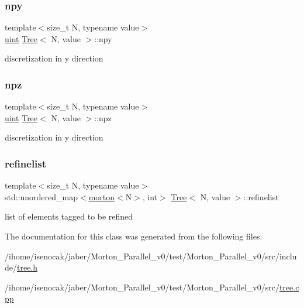 \subsubsection{\texorpdfstring{npy}{npy}}
{\footnotesize\ttfamily template$<$size\+\_\+t N, typename value$>$ \\
\mbox{\hyperlink{definitions_8h_a69aa29b598b851b0640aa225a9e5d61d}{uint}} \mbox{\hyperlink{classTree}{Tree}}$<$ N, value $>$\+::npy\hspace{0.3cm}{\ttfamily [protected]}}

discretization in y direction \mbox{\label{classTree_a0b132f3e84c33e27e1f78f0542081e7b}} 
\subsubsection{\texorpdfstring{npz}{npz}}
{\footnotesize\ttfamily template$<$size\+\_\+t N, typename value$>$ \\
\mbox{\hyperlink{definitions_8h_a69aa29b598b851b0640aa225a9e5d61d}{uint}} \mbox{\hyperlink{classTree}{Tree}}$<$ N, value $>$\+::npz\hspace{0.3cm}{\ttfamily [protected]}}

discretization in y direction \mbox{\label{classTree_a2fbb2b9ed44f73aa10192eab2a9d126b}} 
\subsubsection{\texorpdfstring{refinelist}{refinelist}}
{\footnotesize\ttfamily template$<$size\+\_\+t N, typename value$>$ \\
std\+::unordered\+\_\+map$<$\mbox{\hyperlink{definitions_8h_af8682350bd8bb38ee9023f7a0a310add}{morton}}$<$N$>$, int$>$ \mbox{\hyperlink{classTree}{Tree}}$<$ N, value $>$\+::refinelist\hspace{0.3cm}{\ttfamily [private]}}

list of elements tagged to be refined 

The documentation for this class was generated from the following files\+:\begin{DoxyCompactItemize}
\item 
/ihome/isenocak/jaber/\+Morton\+\_\+\+Parallel\+\_\+v0/test/\+Morton\+\_\+\+Parallel\+\_\+v0/src/include/\mbox{\hyperlink{tree_8h}{tree.\+h}}\item 
/ihome/isenocak/jaber/\+Morton\+\_\+\+Parallel\+\_\+v0/test/\+Morton\+\_\+\+Parallel\+\_\+v0/src/\mbox{\hyperlink{tree_8cpp}{tree.\+cpp}}\end{DoxyCompactItemize}
